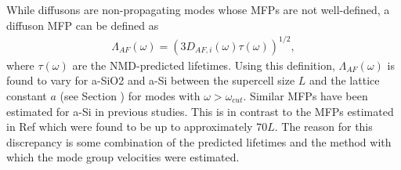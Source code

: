 \documentclass[aps,prb,onecolumn,preprint,superscriptaddress,footinbib,amsmath,amssymb,floatfix]{revtex4}
\begin{document}
While diffusons are non-propagating modes whose MFPs are not 
well-defined, a diffuson MFP can be defined as
\begin{equation}\label{EQ:LambdaAF}
\begin{split}
\Lambda_{AF}(\omega) = (3D_{AF,i}(\omega)\tau(\omega))^{1/2},
\end{split}
\end{equation}
where $\tau(\omega)$ are the NMD-predicted lifetimes. Using this 
definition, $\Lambda_{AF}(\omega)$ is found to vary 
for a-SiO2 and a-Si between 
the supercell size $L$ and the lattice constant $a$ 
(see Section ) for modes with $\omega > \omega_{cut}$. 
Similar MFPs have been estimated for a-Si in 
previous studies.\cite{feldman_thermal_1993,feldman_numerical_1999} 
This is in contrast to the MFPs estimated in Ref 
which were found to be up to approximately $70 L$. The reason 
for this discrepancy is some combination of the predicted lifetimes 
and the method with which the mode group velocities were estimated.
\cite{he_heat_2011}
\end{document}
